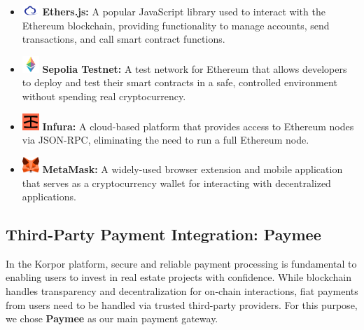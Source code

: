 \begin{itemize}
\begin{itemize}
    \item \includegraphics[width=0.05\textwidth]{images/icons/etherscan.png} \textbf{Ethers.js:} A popular JavaScript library used to interact with the Ethereum blockchain, providing functionality to manage accounts, send transactions, and call smart contract functions.
    
    \item \includegraphics[width=0.05\textwidth]{images/icons/sepolia.png} \textbf{Sepolia Testnet:} A test network for Ethereum that allows developers to deploy and test their smart contracts in a safe, controlled environment without spending real cryptocurrency.
    
    \item \includegraphics[width=0.05\textwidth]{images/icons/infura.png} \textbf{Infura:} A cloud-based platform that provides access to Ethereum nodes via JSON-RPC, eliminating the need to run a full Ethereum node.
    
    \item \includegraphics[width=0.05\textwidth]{images/icons/metamask.png} \textbf{MetaMask:} A widely-used browser extension and mobile application that serves as a cryptocurrency wallet for interacting with decentralized applications.
   \end{itemize}
\end{itemize}

\subsection{Third-Party Payment Integration: Paymee}

In the Korpor platform, secure and reliable payment processing is fundamental to enabling users to invest in real estate projects with confidence. While blockchain handles transparency and decentralization for on-chain interactions, fiat payments from users need to be handled via trusted third-party providers. For this purpose, we chose \textbf{Paymee} as our main payment gateway.

